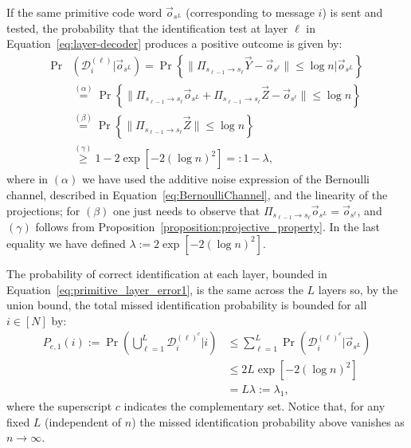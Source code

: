 \documentclass[10pt, conference]{IEEEtran}
\newcommand{\1}{\mathds{1}}
\newcommand{\cD}{\mathcal{D}}
\begin{document}
If the same primitive code word $\vec o_{s^L}$ (corresponding to message $i$) is sent and tested, the probability that the identification test at layer $\ell$ in Equation~\eqref{eq:layer-decoder} produces a positive outcome is given by:
\begin{align}
\Pr&(\cD_i^{(\ell)}|\vec o_{s^L})=\Pr\left\{\|\Pi_{s_{\ell-1}\to s_{\ell}}\vec{Y}-\vec{o}_{s^\ell}\|\leq\log n|\vec o_{s^L}\right\}\nonumber\\
&\stackrel{(\alpha)}{=}\Pr\left\{\|\Pi_{s_{\ell-1}\to s_{\ell}}\vec o_{s^L}+\Pi_{s_{\ell-1}\to s_{\ell}}\vec{Z}-\vec{o}_{s^\ell}\|\leq \log n\right\}\nonumber\\
&\stackrel{(\beta)}{=}\Pr\left\{\|\Pi_{s_{\ell-1}\to s_{\ell}}\vec{Z}\|\leq\log n\right\}\nonumber\\
&\stackrel{(\gamma)}{\geq}1-2\exp\left[-2(\log n)^2\right]=:1-\lambda,\label{eq:primitive_layer_error1}
\end{align}
where in $(\alpha)$ we have used the additive noise expression of the Bernoulli channel, described in Equation~\eqref{eq:BernoulliChannel}, and the linearity of the projections; for $(\beta)$ one just needs to observe that $\Pi_{s_{\ell-1}\to s_{\ell}}\vec o_{s^L}=\vec{o}_{s^\ell}$, and $(\gamma)$ follows from Proposition~\ref{proposition:projective_property}. In the last equality we have defined
\(
    \lambda:=2\exp\left[-2(\log n)^2\right].
\)

The probability of correct identification at each layer, bounded in Equation~\eqref{eq:primitive_layer_error1}, is the same across the $L$ layers so, by the union bound, the total missed identification probability is bounded for all $i\in[N]$ by:
\begin{equation}\label{eq:main_Pe1}
\begin{split}
\!\!P_{e,1}(i):=\Pr\left(\bigcup_{\ell=1}^{L}\cD_i^{(\ell)^c}| i\right)&\leq\sum_{\ell=1}^{L}\Pr\left(\cD_i^{(\ell)^c}|\vec o_{s^L}\right)\\
&\leq2L\exp\left[-2(\log n)^2\right]\\
&=L\lambda:=\lambda_1,
\end{split}
\end{equation}
where the superscript $c$ indicates the complementary set. Notice that, for any fixed $L$ (independent of $n$) the missed identification probability above vanishes as $n\to \infty$. 
\end{document}
